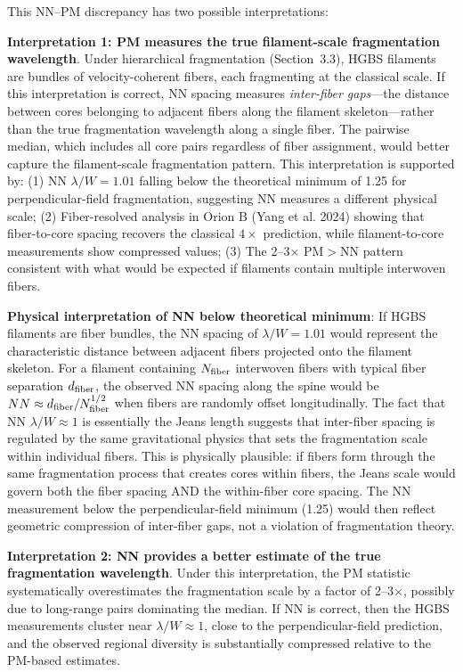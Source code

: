\documentclass[twoside,twocolumn]{mnras}
\begin{document}
\begin{enumerate}
This NN--PM discrepancy has two possible interpretations:

\textbf{Interpretation 1: PM measures the true filament-scale fragmentation wavelength}. Under hierarchical fragmentation (Section~3.3), HGBS filaments are bundles of velocity-coherent fibers, each fragmenting at the classical scale. If this interpretation is correct, NN spacing measures \textit{inter-fiber gaps}---the distance between cores belonging to adjacent fibers along the filament skeleton---rather than the true fragmentation wavelength along a single fiber. The pairwise median, which includes all core pairs regardless of fiber assignment, would better capture the filament-scale fragmentation pattern. This interpretation is supported by: (1) NN $\lambda/W = 1.01$ falling below the theoretical minimum of 1.25 for perpendicular-field fragmentation, suggesting NN measures a different physical scale; (2) Fiber-resolved analysis in Orion B (Yang et al. 2024) showing that fiber-to-core spacing recovers the classical $4\times$ prediction, while filament-to-core measurements show compressed values; (3) The 2--3$\times$ PM$>$NN pattern consistent with what would be expected if filaments contain multiple interwoven fibers.

\textbf{Physical interpretation of NN below theoretical minimum}: If HGBS filaments are fiber bundles, the NN spacing of $\lambda/W = 1.01$ would represent the characteristic distance between adjacent fibers projected onto the filament skeleton. For a filament containing $N_{\rm fiber}$ interwoven fibers with typical fiber separation $d_{\rm fiber}$, the observed NN spacing along the spine would be $NN \approx d_{\rm fiber} / N_{\rm fiber}^{1/2}$ when fibers are randomly offset longitudinally. The fact that NN $\lambda/W \approx 1$ is essentially the Jeans length suggests that inter-fiber spacing is regulated by the same gravitational physics that sets the fragmentation scale within individual fibers. This is physically plausible: if fibers form through the same fragmentation process that creates cores within fibers, the Jeans scale would govern both the fiber spacing AND the within-fiber core spacing. The NN measurement below the perpendicular-field minimum (1.25) would then reflect geometric compression of inter-fiber gaps, not a violation of fragmentation theory.

\textbf{Interpretation 2: NN provides a better estimate of the true fragmentation wavelength}. Under this interpretation, the PM statistic systematically overestimates the fragmentation scale by a factor of 2--3$\times$, possibly due to long-range pairs dominating the median. If NN is correct, then the HGBS measurements cluster near $\lambda/W \approx 1$, close to the perpendicular-field prediction, and the observed regional diversity is substantially compressed relative to the PM-based estimates.


\end{enumerate}
\end{document}
